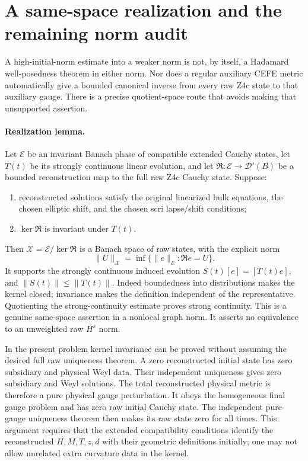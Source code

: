 \section{A same-space realization and the remaining norm audit}
\label{sec:linear-phase-quotient-audit}

A high-initial-norm estimate into a weaker norm is not, by itself, a
Hadamard well-posedness theorem in either norm.  Nor does a regular auxiliary
CEFE metric automatically give a bounded canonical inverse from every raw
Z4c state to that auxiliary gauge.  There is a precise quotient-space route
that avoids making that unsupported assertion.

\paragraph{Realization lemma.}
Let $\mathcal E$ be an invariant Banach phase of compatible extended Cauchy
states, let $T(t)$ be its strongly continuous linear evolution, and let
$\mathfrak R:\mathcal E\to\mathcal D'(B)$ be a bounded reconstruction map
to the full raw Z4c Cauchy state.  Suppose:
\begin{enumerate}
\item reconstructed solutions satisfy the original linearized bulk equations,
the chosen elliptic shift, and the chosen scri lapse/shift conditions;
\item $\ker\mathfrak R$ is invariant under $T(t)$.
\end{enumerate}
Then $\mathcal X=\mathcal E/\ker\mathfrak R$ is a Banach space of raw states,
with the explicit norm
\[
 \|U\|_{\mathcal X}
 =\inf\{\|e\|_{\mathcal E}:\mathfrak R e=U\}.
\]
It supports the strongly continuous induced evolution
$S(t)[e]=[T(t)e]$, and
$\|S(t)\|\leq\|T(t)\|$.
Indeed boundedness into distributions makes the kernel closed; invariance
makes the definition independent of the representative.  Quotienting the
strong-continuity estimate proves strong continuity.  This is a genuine
same-space assertion in a nonlocal graph norm.  It asserts no equivalence to
an unweighted raw $H^s$ norm.

In the present problem kernel invariance can be proved without assuming the
desired full raw uniqueness theorem.  A zero reconstructed initial state has
zero subsidiary and physical Weyl data.  Their independent uniqueness gives
zero subsidiary and Weyl solutions.  The total reconstructed physical metric
is therefore a pure physical gauge perturbation.  It obeys the homogeneous
final gauge problem and has zero raw initial Cauchy state.  The independent
pure-gauge uniqueness theorem then makes its raw state zero for all times.
This argument requires that the extended compatibility conditions identify
the reconstructed $H,M,T,z,d$ with their geometric definitions initially;
one may not allow unrelated extra curvature data in the kernel.

